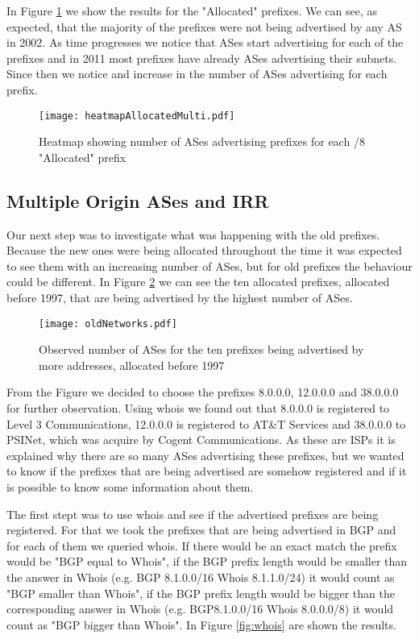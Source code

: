 \documentclass[11pt,a4paper]{scrreprt}
\begin{document}
In Figure \ref{fig:heatmapAllocatedMulti} we show the results for the "Allocated" prefixes. We can see, as expected, that the majority of the prefixes were not being advertised by any AS in 2002. As time progresses we notice that ASes start advertising for each of the prefixes and in 2011 most prefixes have already ASes advertising their subnets. Since then we notice and increase in the number of ASes advertising for each prefix.

\begin{figure}[!h]
\centering
\texttt{[image: heatmapAllocatedMulti.pdf]}
\caption{Heatmap showing number of ASes advertising prefixes for each /8 "Allocated" prefix}
\label{fig:heatmapAllocatedMulti}
\end{figure}

\subsection{Multiple Origin ASes and IRR}

Our next step was to investigate what was happening with the old prefixes. Because the new ones were being allocated throughout the time it was expected to see them with an increasing number of ASes, but for old prefixes the behaviour could be different. 
In Figure \ref{fig:oldNetworks} we can see the ten allocated prefixes, allocated before 1997, that are being advertised by the highest number of ASes.

\begin{figure}[!h]
\centering
\texttt{[image: oldNetworks.pdf]}
\caption{Observed number of ASes for the ten prefixes being advertised by more addresses, allocated before 1997}
\label{fig:oldNetworks}
\end{figure}

From the Figure we decided to choose the prefixes 8.0.0.0, 12.0.0.0 and 38.0.0.0 for further observation. Using whois we found out that 8.0.0.0 is registered to Level 3 Communications, 12.0.0.0 is registered to AT\&T Services and 38.0.0.0 to PSINet, which was acquire by Cogent Communications.
As these are ISPs it is explained why there are so many ASes advertising these prefixes, but we wanted to know if the prefixes that are being advertised are somehow registered and if it is possible to know some information about them.

The first stept was to use whois and see if the advertised prefixes are being registered. For that we took the prefixes that are being advertised in BGP and for each of them we queried whois. If there would be an exact match the prefix would be "BGP equal to Whois", if the BGP prefix length would be smaller than the answer in Whois (e.g. BGP 8.1.0.0/16 Whois 8.1.1.0/24) it would count as "BGP smaller than Whois", if the BGP prefix length would be bigger than the corresponding answer in Whois (e.g. BGP8.1.0.0/16 Whois 8.0.0.0/8) it would count as "BGP bigger than Whois". In Figure \ref{fig:whois} are shown the results.
\end{document}

